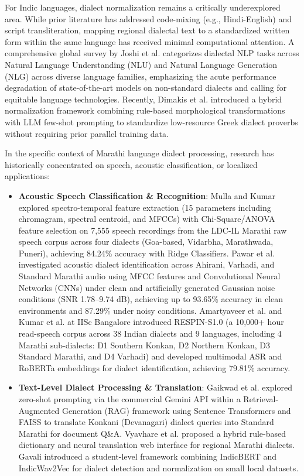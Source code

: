 For Indic languages, dialect normalization remains a critically underexplored area. While prior literature has addressed code-mixing (e.g., Hindi-English) and script transliteration, mapping regional dialectal text to a standardized written form within the same language has received minimal computational attention. A comprehensive global survey by Joshi et al. \cite{joshi2025survey} categorizes dialectal NLP tasks across Natural Language Understanding (NLU) and Natural Language Generation (NLG) across diverse language families, emphasizing the acute performance degradation of state-of-the-art models on non-standard dialects and calling for equitable language technologies. Recently, Dimakis et al. \cite{dimakis2025dialect} introduced a hybrid normalization framework combining rule-based morphological transformations with LLM few-shot prompting to standardize low-resource Greek dialect proverbs without requiring prior parallel training data.

In the specific context of Marathi language dialect processing, research has historically concentrated on speech, acoustic classification, or localized applications:
\begin{itemize}
    \item \textbf{Acoustic Speech Classification & Recognition}: Mulla and Kumar \cite{mulla2022text} explored spectro-temporal feature extraction (15 parameters including chromagram, spectral centroid, and MFCCs) with Chi-Square/ANOVA feature selection on 7,555 speech recordings from the LDC-IL Marathi raw speech corpus across four dialects (Goa-based, Vidarbha, Marathwada, Puneri), achieving 84.24\% accuracy with Ridge Classifiers. Pawar et al. \cite{pawar2026automatic} investigated acoustic dialect identification across Ahirani, Varhadi, and Standard Marathi audio using MFCC features and Convolutional Neural Networks (CNNs) under clean and artificially generated Gaussian noise conditions (SNR 1.78--9.74 dB), achieving up to 93.65\% accuracy in clean environments and 87.29\% under noisy conditions. Amartyaveer et al. \cite{amartyaveer2025improving} and Kumar et al. \cite{kumar2025respin} at IISc Bangalore introduced RESPIN-S1.0 (a 10,000+ hour read-speech corpus across 38 Indian dialects and 9 languages, including 4 Marathi sub-dialects: D1 Southern Konkan, D2 Northern Konkan, D3 Standard Marathi, and D4 Varhadi) and developed multimodal ASR and RoBERTa embeddings for dialect identification, achieving 79.81\% accuracy.
    \item \textbf{Text-Level Dialect Processing & Translation}: Gaikwad et al. \cite{gaikwad2025marathi} explored zero-shot prompting via the commercial Gemini API within a Retrieval-Augmented Generation (RAG) framework using Sentence Transformers and FAISS to translate Konkani (Devanagari) dialect queries into Standard Marathi for document Q\&A. Vyavhare et al. \cite{vyavhare2026marathi} proposed a hybrid rule-based dictionary and neural translation web interface for regional Marathi dialects. Gavali \cite{gavali2026marathi} introduced a student-level framework combining IndicBERT and IndicWav2Vec for dialect detection and normalization on small local datasets.
\end{itemize}


